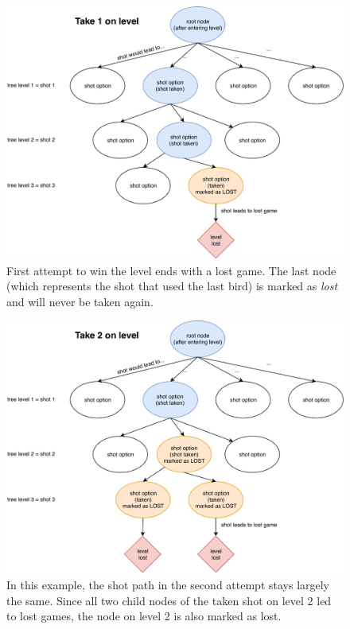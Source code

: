 \begin{figure}
	\includegraphics[width=\textwidth]{img/take1onlevel.pdf}
	\caption{First attempt to win the level ends with a lost game. The last node (which represents the shot that used the last bird) is marked as \textit{lost} and will never be taken again.}\label{fig:take1}
\end{figure}
\begin{figure}
	\includegraphics[width=\textwidth]{img/take2onlevel.pdf}
	\caption{In this example, the shot path in the second attempt stays largely the same. Since all two child nodes of the taken shot on level 2 led to lost games, the node on level 2 is also marked as lost.}\label{fig:take2}
\end{figure}


